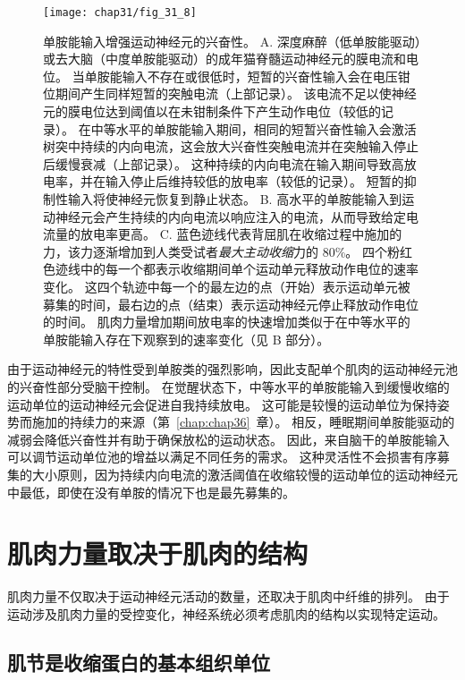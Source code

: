 \begin{figure}[htbp]
	\centering
	\texttt{[image: chap31/fig\_31\_8]}
	\caption{单胺能输入增强运动神经元的兴奋性\cite{heckman2009motoneuron,erim1996rank}。
	A. 深度麻醉（低单胺能驱动）或去大脑（中度单胺能驱动）的成年猫脊髓运动神经元的膜电流和电位。
	当单胺能输入不存在或很低时，短暂的兴奋性输入会在电压钳位期间产生同样短暂的突触电流（上部记录）。
	该电流不足以使神经元的膜电位达到阈值以在未钳制条件下产生动作电位（较低的记录）。
	在中等水平的单胺能输入期间，相同的短暂兴奋性输入会激活树突中持续的内向电流，这会放大兴奋性突触电流并在突触输入停止后缓慢衰减（上部记录）。
	这种持续的内向电流在输入期间导致高放电率，并在输入停止后维持较低的放电率（较低的记录）。
	短暂的抑制性输入将使神经元恢复到静止状态。
	B. 高水平的单胺能输入到运动神经元会产生持续的内向电流以响应注入的电流，从而导致给定电流量的放电率更高。
	C. 蓝色迹线代表背屈肌在收缩过程中施加的力，该力逐渐增加到人类受试者\textit{最大主动收缩}力的 80\%。
	四个粉红色迹线中的每一个都表示收缩期间单个运动单元释放动作电位的速率变化。 
	这四个轨迹中每一个的最左边的点（开始）表示运动单元被募集的时间，最右边的点（结束）表示运动神经元停止释放动作电位的时间。
	肌肉力量增加期间放电率的快速增加类似于在中等水平的单胺能输入存在下观察到的速率变化（见 B 部分）。}
	\label{fig:31_8}
\end{figure}


由于运动神经元的特性受到单胺类的强烈影响，因此支配单个肌肉的运动神经元池的兴奋性部分受脑干控制。
在觉醒状态下，中等水平的单胺能输入到缓慢收缩的运动单位的运动神经元会促进自我持续放电。
这可能是较慢的运动单位为保持姿势而施加的持续力的来源（第~\ref{chap:chap36}~章）。
相反，睡眠期间单胺能驱动的减弱会降低兴奋性并有助于确保放松的运动状态。
因此，来自脑干的单胺能输入可以调节运动单位池的增益以满足不同任务的需求。
这种灵活性不会损害有序募集的大小原则，因为持续内向电流的激活阈值在收缩较慢的运动单位的运动神经元中最低，即使在没有单胺的情况下也是最先募集的。



\section{肌肉力量取决于肌肉的结构}

肌肉力量不仅取决于运动神经元活动的数量，还取决于肌肉中纤维的排列。
由于运动涉及肌肉力量的受控变化，神经系统必须考虑肌肉的结构以实现特定运动。



\subsection{肌节是收缩蛋白的基本组织单位}

